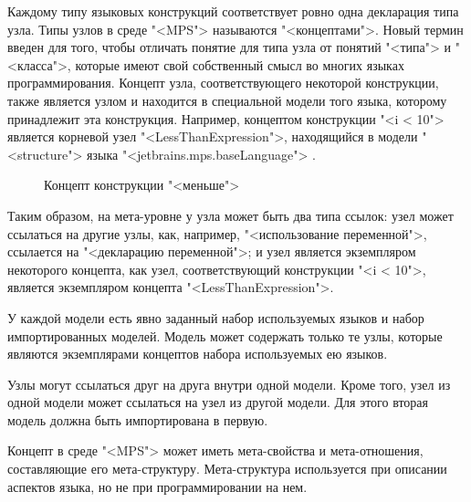 Каждому типу языковых конструкций соответствует ровно одна декларация типа узла. Типы узлов в среде "<MPS"> называются "<концептами">. Новый термин введен для того, чтобы отличать понятие для типа узла от понятий "<типа"> и "<класса">, которые имеют свой собственный смысл во многих языках программирования. Концепт узла, соответствующего некоторой конструкции, также является узлом и находится в специальной модели того языка, которому принадлежит эта конструкция. Например, концептом конструкции "<i < 10"> является корневой узел "<LessThanExpression">, находящийся в модели "<structure"> языка "<jetbrains.mps.baseLanguage"> \pic{\ref{fig:LessThenExpressionConcept}}.

\begin{figure}
 \centering
 \caption{Концепт конструкции "<меньше">}
 \label{fig:LessThenExpressionConcept}
\end{figure}


Таким образом, на мета-уровне у узла может быть два типа ссылок: узел может ссылаться на другие узлы, как, например, "<использование переменной">, ссылается на "<декларацию переменной">; и узел является экземпляром некоторого концепта, как узел, соответствующий конструкции "<i < 10">, является экземпляром концепта "<LessThanExpression">.

У каждой модели есть явно заданный набор используемых языков и набор импортированных моделей. Модель может содержать только те узлы, которые являются экземплярами концептов набора используемых ею языков.

Узлы могут ссылаться друг на друга внутри одной модели. Кроме того, узел из одной модели может ссылаться на узел из другой модели. Для этого вторая модель должна быть импортирована в первую.

Концепт в среде "<MPS"> может иметь мета-свойства и мета-отношения, составляющие его мета-структуру. Мета-структура используется при описании аспектов языка, но не при программировании на нем.
